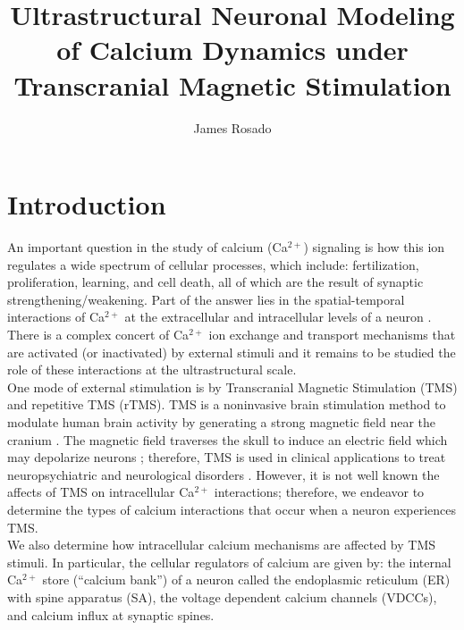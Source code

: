 \documentclass[12pt]{article}
\title{Ultrastructural Neuronal Modeling of Calcium Dynamics under Transcranial Magnetic Stimulation}
\author{James Rosado}
\begin{document}
\maketitle

\section{Introduction}
 An important question in the study of calcium (Ca$^{2+}$) signaling is how this ion regulates a wide spectrum of cellular processes, which include: fertilization, proliferation, learning, and cell death, all of which are the result of synaptic strengthening/weakening. Part of the answer lies in the spatial-temporal interactions of Ca$^{2+}$ at the extracellular and intracellular levels of a neuron \cite{SMEDLER2014964}. There is a complex concert of Ca$^{2+}$ ion exchange and transport mechanisms that are activated (or inactivated) by external stimuli and it remains to be studied the role of these interactions at the ultrastructural scale. \\
\indent One mode of external stimulation is by Transcranial Magnetic Stimulation (TMS) and repetitive TMS (rTMS). TMS is a noninvasive brain stimulation method to modulate human brain activity by generating a strong magnetic field near the cranium  \cite{Barker1985}. The magnetic field traverses the skull to induce an electric field which may depolarize neurons \cite{Hallett2007}; therefore, TMS is used in clinical applications to treat neuropsychiatric and neurological disorders \cite{Lefaucheur2014}. However, it is not well known the affects of TMS on intracellular Ca$^{2+}$ interactions; therefore, we endeavor to determine the types of calcium interactions that occur when a neuron experiences TMS.  \\
\indent %
We also determine how intracellular calcium mechanisms are affected by TMS stimuli. In particular, the cellular regulators of calcium are given by: the internal Ca$^{2+}$ store (``calcium bank'') of a neuron called the endoplasmic reticulum (ER) with spine apparatus (SA), the voltage dependent calcium channels (VDCCs), and calcium influx at synaptic spines. %
\end{document}
